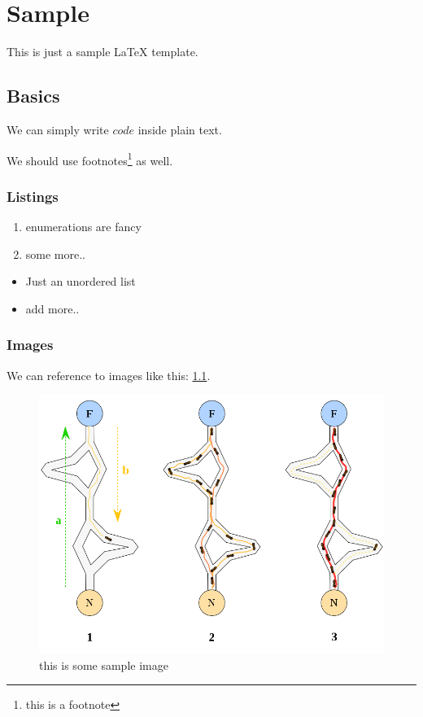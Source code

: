 \chapter{Sample}

This is just a sample LaTeX template. \cite{YB}
\section{Basics}

We can simply write $code$ inside plain text. \cite[Kap. 1.2]{Bro11}

We should use footnotes\footnote{this is a footnote} as well.

\subsection{Listings}

\begin{enumerate}
    \item enumerations are fancy
    \item some more..
\end{enumerate}

\begin{itemize}
    \item Just an unordered list
    \item add more..
\end{itemize}

\subsection{Images}

We can reference to images like this: \ref{fig:sample}.

\begin{figure}[h!]
    \centering
    \includegraphics[scale=0.5]{resources/sample.png}
    \caption{this is some sample image \cite{YB}}
    \label{fig:sample}
\end{figure}

